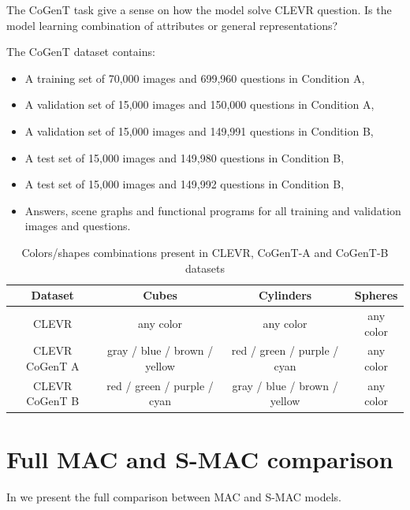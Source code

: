 The CoGenT task give a sense on how the model solve CLEVR question. Is the model learning combination of attributes or general representations?

The CoGenT dataset contains:
\begin{itemize}
\item	A training set of 70,000 images and 699,960 questions in Condition A,
\item	A validation set of 15,000 images and 150,000 questions in Condition A,
\item	A validation set of 15,000 images and 149,991 questions in Condition B,
\item	A test set of 15,000 images and 149,980 questions in Condition B,
\item	A test set of 15,000 images and 149,992 questions in Condition B,
\item	Answers, scene graphs and functional programs for all training and validation images and questions.
\end{itemize}

\begin{table}[h!]
	\centering
	\begin{tabular}{cccc}
		\toprule
		Dataset        & Cubes              & Cylinders &  Spheres         \\
		\midrule
		CLEVR   &  any color &  any color        &    any color    \\
		CLEVR CoGenT A & gray / blue / brown / yellow  & red / green / purple / cyan       &    any color  \\
		CLEVR CoGenT B  & red / green / purple / cyan &   gray / blue / brown / yellow       &      any color  \\
		\bottomrule
	\end{tabular}
	\caption{Colors/shapes combinations present in CLEVR, CoGenT-A and CoGenT-B datasets}
	\label{tab:cogent_conditions}
\end{table}

 
\section{Full MAC and S-MAC comparison}

In  we present the full comparison between MAC and S-MAC models.


